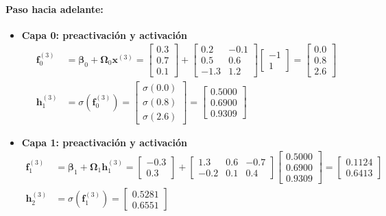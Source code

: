 \documentclass[10pt,a4paper]{article}
\begin{document}
\paragraph{Paso hacia adelante:}
\begin{itemize}\itemsep-3pt   
    \item \textbf{Capa 0: preactivación y activación}
    \begin{align*}
    \mathbf{f}_0^{(3)} &= \boldsymbol{\beta}_0 + \boldsymbol{\Omega}_0 \mathbf{x}^{(3)} = \begin{bmatrix} 0.3 \\ 0.7 \\ 0.1 \end{bmatrix} + \begin{bmatrix} 0.2 & -0.1 \\ 0.5 & 0.6 \\ -1.3 & 1.2 \end{bmatrix} \begin{bmatrix} -1 \\ 1 \end{bmatrix} = \begin{bmatrix} 0.0 \\ 0.8 \\ 2.6 \end{bmatrix} \\[0.1cm]
    \mathbf{h}_1^{(3)} &= \sigma(\mathbf{f}_0^{(3)}) = \begin{bmatrix} \sigma(0.0) \\ \sigma(0.8) \\ \sigma(2.6) \end{bmatrix} = \begin{bmatrix} 0.5000 \\ 0.6900 \\ 0.9309 \end{bmatrix}
    \end{align*}

    \item \textbf{Capa 1: preactivación y activación}
    \begin{align*}
    \mathbf{f}_1^{(3)} &= \boldsymbol{\beta}_1 + \boldsymbol{\Omega}_1 \mathbf{h}_1^{(3)} = \begin{bmatrix} -0.3 \\ 0.3 \end{bmatrix} + \begin{bmatrix} 1.3 & 0.6 & -0.7 \\ -0.2 & 0.1 & 0.4 \end{bmatrix} \begin{bmatrix} 0.5000 \\ 0.6900 \\ 0.9309 \end{bmatrix} = \begin{bmatrix} 0.1124 \\ 0.6413 \end{bmatrix} \\[0.1cm]
    \mathbf{h}_2^{(3)} &= \sigma(\mathbf{f}_1^{(3)}) = \begin{bmatrix} 0.5281 \\ 0.6551 \end{bmatrix}
    \end{align*}


\end{itemize}
\end{document}
